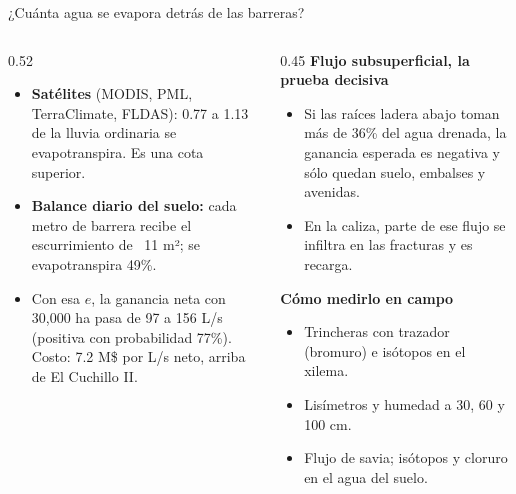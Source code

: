 \documentclass[aspectratio=169,10pt]{beamer}
\begin{document}
\begin{frame}{¿Cuánta agua se evapora detrás de las barreras?}
\begin{columns}[T]
\begin{column}{0.52\textwidth}
\small
\begin{itemize}
  \item \textbf{Satélites} (MODIS, PML, TerraClimate, FLDAS): 0.77 a 1.13 de la lluvia ordinaria se evapotranspira. Es una cota superior.
  \item \textbf{Balance diario del suelo:} cada metro de barrera recibe el escurrimiento de ~11 m²; se evapotranspira 49\%.
  \item Con esa $e$, la ganancia neta con 30,000 ha pasa de 97 a 156 L/s (positiva con probabilidad 77\%). Costo: 7.2 M\$ por L/s neto, arriba de El Cuchillo II.
\end{itemize}
\end{column}
\begin{column}{0.45\textwidth}
\footnotesize
\textbf{Flujo subsuperficial, la prueba decisiva}
\begin{itemize}
  \item Si las raíces ladera abajo toman más de 36\% del agua drenada, la ganancia esperada es negativa y sólo quedan suelo, embalses y avenidas.
  \item En la caliza, parte de ese flujo se infiltra en las fracturas y es recarga.
\end{itemize}
\textbf{Cómo medirlo en campo}
\begin{itemize}
  \item Trincheras con trazador (bromuro) e isótopos en el xilema.
  \item Lisímetros y humedad a 30, 60 y 100 cm.
  \item Flujo de savia; isótopos y cloruro en el agua del suelo.
\end{itemize}
\end{column}
\end{columns}
\end{frame}
\end{document}
